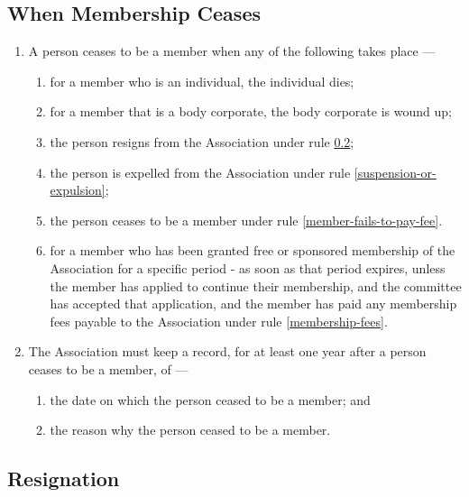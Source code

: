 \documentclass[../constitution.tex]{subfiles}
\begin{document}
\subsection{When Membership Ceases} \label{when-membership-ceases}

\begin{enumerate}

  \item A person ceases to be a member when any of the following takes place ---

        \begin{enumerate}

          \item for a member who is an individual, the individual dies;
          \item for a member that is a body corporate, the body corporate is wound up;
          \item the person resigns from the Association under rule \ref{resignation};
          \item the person is expelled from the Association under rule \ref{suspension-or-expulsion};
          \item the person ceases to be a member under rule \ref{member-fails-to-pay-fee}.
          \item for a member who has been granted free or sponsored membership of the Association for a specific period - as soon as that period expires, unless the member has applied to continue their membership, and the committee has accepted that application, and the member has paid any membership fees payable to the Association under rule \ref{membership-fees}. \label{free-and-sponsored-memberships-expire}
        \end{enumerate}
  \item The Association must keep a record, for at least one year after a person ceases to be a member, of ---

        \begin{enumerate}

          \item the date on which the person ceased to be a member; and
          \item the reason why the person ceased to be a member.
        \end{enumerate}
\end{enumerate}


\subsection{Resignation} \label{resignation}
\end{document}
